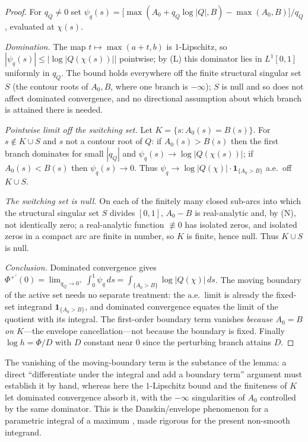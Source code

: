 \documentclass[11pt,reqno]{amsart}
\theoremstyle{plain}
\theoremstyle{definition}
\begin{document}
\begin{proof}
For $q_Q\ne0$ set $\psi_q(s)=\bigl[\max(A_0+q_Q\log|Q|,B)-\max(A_0,B)\bigr]/q_Q$,
evaluated at $\chi(s)$.

\emph{Domination.} The map $t\mapsto\max(a+t,b)$ is $1$-Lipschitz, so
$|\psi_q(s)|\le|\log|Q(\chi(s))||$ pointwise; by (L) this dominator lies in $L^1[0,1]$
uniformly in $q_Q$. The bound holds everywhere off the finite structural singular set
$S$ (the contour roots of $A_0,B$, where one branch is $-\infty$); $S$ is null and so
does not affect dominated convergence, and no directional assumption about which branch
is attained there is needed.

\emph{Pointwise limit off the switching set.} Let $K=\{s:A_0(s)=B(s)\}$. For
$s\notin K\cup S$ and $s$ not a contour root of $Q$: if $A_0(s)>B(s)$ then the first
branch dominates for small $|q_Q|$ and $\psi_q(s)\to\log|Q(\chi(s))|$; if $A_0(s)<B(s)$
then $\psi_q(s)\to0$. Thus $\psi_q\to\log|Q(\chi)|\cdot\mathbf 1_{\{A_0>B\}}$ a.e.\ off
$K\cup S$.

\emph{The switching set is null.} On each of the finitely many closed sub-arcs into
which the structural singular set $S$ divides $[0,1]$, $A_0-B$ is real-analytic and, by
(N), not identically zero; a real-analytic function $\not\equiv0$ has isolated
zeros, and isolated zeros in a compact arc are finite in number, so $K$ is finite,
hence null. Thus $K\cup S$ is null.

\emph{Conclusion.} Dominated convergence gives
$\Phi^{+\prime}(0)=\lim_{q_Q\to0^+}\int_0^1\psi_q\,ds
=\int_{\{A_0>B\}}\log|Q(\chi)|\,ds$. The moving boundary of the active set needs no
separate treatment: the a.e.\ limit is already the fixed-set integrand
$\mathbf 1_{\{A_0>B\}}$, and dominated convergence equates the limit of the quotient
with its integral. The first-order boundary term vanishes \emph{because $A_0=B$ on
$K$}---the envelope cancellation---not because the boundary is fixed. Finally
$\log h=\Phi/D$ with $D$ constant near $0$ since the perturbing branch attains $D$.
\end{proof}

The vanishing of the moving-boundary term is the substance of the lemma: a direct
``differentiate under the integral and add a boundary term'' argument must establish
it by hand, whereas here the $1$-Lipschitz bound and the finiteness of $K$ let
dominated convergence absorb it, with the $-\infty$ singularities of $A_0$ controlled
by the same dominator. This is the Danskin/envelope phenomenon for a parametric
integral of a maximum \citep{Ber99}, made rigorous for the present non-smooth
integrand.
\end{document}
